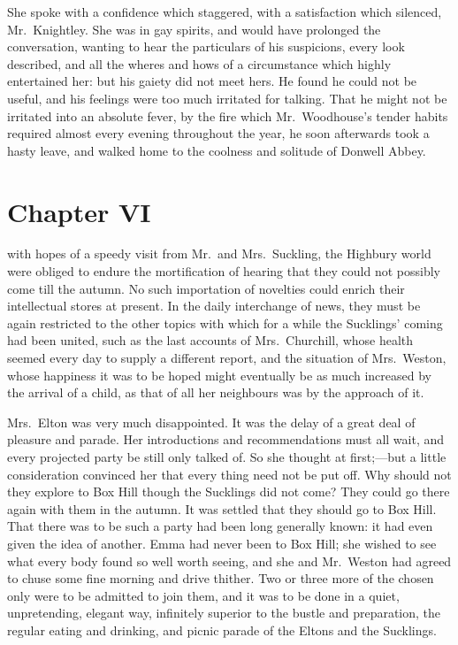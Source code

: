 She spoke with a confidence which staggered, with a satisfaction
which silenced, Mr.\ Knightley.  She was in gay spirits, and would
have prolonged the conversation, wanting to hear the particulars
of his suspicions, every look described, and all the wheres and hows
of a circumstance which highly entertained her:  but his gaiety did
not meet hers.  He found he could not be useful, and his feelings
were too much irritated for talking.  That he might not be irritated
into an absolute fever, by the fire which Mr.\ Woodhouse's tender
habits required almost every evening throughout the year, he soon
afterwards took a hasty leave, and walked home to the coolness
and solitude of Donwell Abbey.



\chapter{Chapter VI}


 with hopes of a speedy visit from Mr.\ and
Mrs.\ Suckling, the Highbury world were obliged to endure the mortification
of hearing that they could not possibly come till the autumn.
No such importation of novelties could enrich their intellectual stores
at present.  In the daily interchange of news, they must be again
restricted to the other topics with which for a while the Sucklings'
coming had been united, such as the last accounts of Mrs.\ Churchill,
whose health seemed every day to supply a different report,
and the situation of Mrs.\ Weston, whose happiness it was to be hoped
might eventually be as much increased by the arrival of a child,
as that of all her neighbours was by the approach of it.

Mrs.\ Elton was very much disappointed.  It was the delay of a great
deal of pleasure and parade.  Her introductions and recommendations
must all wait, and every projected party be still only talked of.
So she thought at first;---but a little consideration convinced
her that every thing need not be put off.  Why should not they
explore to Box Hill though the Sucklings did not come?  They could
go there again with them in the autumn.  It was settled that they
should go to Box Hill.  That there was to be such a party had been
long generally known:  it had even given the idea of another.
Emma had never been to Box Hill; she wished to see what every body
found so well worth seeing, and she and Mr.\ Weston had agreed
to chuse some fine morning and drive thither.  Two or three more
of the chosen only were to be admitted to join them, and it was to
be done in a quiet, unpretending, elegant way, infinitely superior
to the bustle and preparation, the regular eating and drinking,
and picnic parade of the Eltons and the Sucklings.

